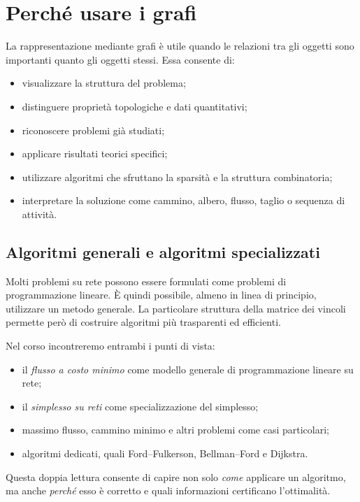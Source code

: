 \documentclass[11pt,a4paper]{article}
\begin{document}
\section{Perché usare i grafi}

La rappresentazione mediante grafi è utile quando le relazioni tra gli oggetti sono importanti quanto gli oggetti stessi. Essa consente di:
\begin{itemize}
\item visualizzare la struttura del problema;
\item distinguere proprietà topologiche e dati quantitativi;
\item riconoscere problemi già studiati;
\item applicare risultati teorici specifici;
\item utilizzare algoritmi che sfruttano la sparsità e la struttura combinatoria;
\item interpretare la soluzione come cammino, albero, flusso, taglio o sequenza di attività.
\end{itemize}

\subsection{Algoritmi generali e algoritmi specializzati}

Molti problemi su rete possono essere formulati come problemi di programmazione lineare. È quindi possibile, almeno in linea di principio, utilizzare un metodo generale. La particolare struttura della matrice dei vincoli permette però di costruire algoritmi più trasparenti ed efficienti.

Nel corso incontreremo entrambi i punti di vista:
\begin{itemize}
\item il \emph{flusso a costo minimo} come modello generale di programmazione lineare su rete;
\item il \emph{simplesso su reti} come specializzazione del simplesso;
\item massimo flusso, cammino minimo e altri problemi come casi particolari;
\item algoritmi dedicati, quali Ford--Fulkerson, Bellman--Ford e Dijkstra.
\end{itemize}

Questa doppia lettura consente di capire non solo \emph{come} applicare un algoritmo, ma anche \emph{perché} esso è corretto e quali informazioni certificano l'ottimalità.
\end{document}

